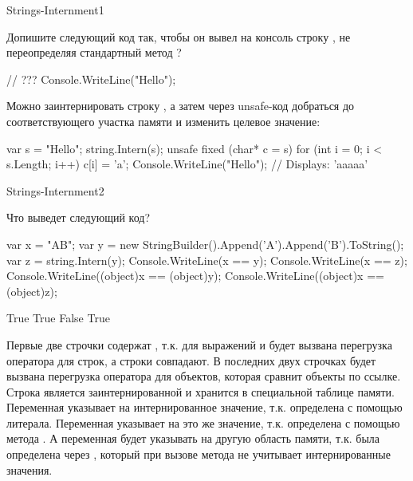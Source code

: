 \begin{defproblem}{Strings-Internment1}
\begin{onlyproblem}
  Допишите следующий код так, чтобы он вывел на консоль строку , не переопределяя стандартный метод ?
  \begin{source}
  // ???
  Console.WriteLine("Hello");
  \end{source}
\end{onlyproblem}
\begin{onlysolution}
  Можно заинтернировать строку , а затем через unsafe-код добраться до соответствующего участка памяти и изменить целевое значение:  
  \begin{source}
  var s = "Hello";
  string.Intern(s);
  unsafe
  {
    fixed (char* c = s)
      for (int i = 0; i < s.Length; i++)
        c[i] = 'a';
  }
  Console.WriteLine("Hello"); // Displays: 'aaaaa'
  \end{source}
\end{onlysolution}
\end{defproblem}
\begin{defproblem}{Strings-Internment2}
\begin{onlyproblem}
  Что выведет следующий код?
  \begin{source}
  var x = "AB";
  var y = new StringBuilder().Append('A').Append('B').ToString(); 
  var z = string.Intern(y);
  Console.WriteLine(x == y);
  Console.WriteLine(x == z);
  Console.WriteLine((object)x == (object)y);
  Console.WriteLine((object)x == (object)z);
  \end{source}
\end{onlyproblem}
\begin{onlysolution}
  \begin{source}
  True
  True
  False
  True
  \end{source}
  Первые две строчки содержат , т.к. для выражений  и  будет вызвана перегрузка оператора \code{==} для строк, а строки совпадают. В последних двух строчках будет вызвана перегрузка оператора \code{==} для объектов, которая сравнит объекты по ссылке. Строка  является заинтернированной и хранится в специальной таблице памяти. Переменная  указывает на интернированное значение, т.к. определена с помощью литерала. Переменная  указывает на это же значение, т.к. определена с помощью метода . А переменная  будет указывать на другую область памяти, т.к. была определена через , который при вызове метода  не учитывает интернированные значения.
\end{onlysolution}
\end{defproblem}
